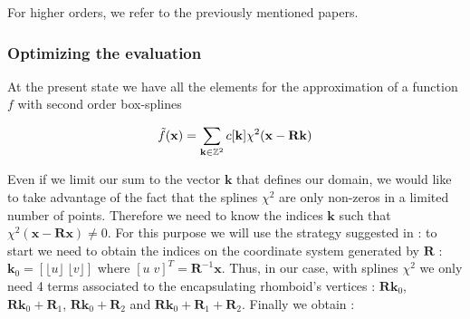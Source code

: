 \documentclass[proc]{edpsmath}
\begin{document}
%

For higher orders, we refer to the previously mentioned papers.

\subsubsection{Optimizing the evaluation}

At the present state we have all the elements for the approximation of a function $f$ with second order box-splines

\begin{equation}
\tilde{f}(\mathbf{x}) = \sum_{\mathbf{k} \in \mathbb{Z}^2} c[\mathbf{k}] \chi^2(\mathbf{x} - \mathbf{R}\mathbf{k})
\end{equation}

Even if we limit our sum to the vector $\mathbf{k}$ that defines our domain, we would like to take advantage of the fact that the splines $\chi^2$ are only non-zeros in a limited number of points. Therefore we need to know the indices $\mathbf{k}$ such that $\chi^2(\mathbf{x} - \mathbf{R} \mathbf{x}) \neq 0$. For this purpose we will use the strategy suggested in \cite{Condat2007} : to start we need to obtain the indices on the coordinate system generated by $\mathbf{R}$ : $\mathbf{k}_0 = \left[ \lfloor u \rfloor \; \lfloor v \rfloor \right]$ where $\left[ u \; v \right]^T = \mathbf{R}^ {-1} \mathbf{x} $. Thus, in our case, with splines $\chi^2$ we only need 4 terms associated to the encapsulating rhomboid's vertices : $\mathbf{R}\mathbf{k}_0$, $\mathbf{R}\mathbf{k}_0 + \mathbf{R}_1$, $\mathbf{R}\mathbf{k}_0 + \mathbf{R}_2$ and $\mathbf{R}\mathbf{k}_0 + \mathbf{R}_1 + \mathbf{R}_2$. Finally we obtain :
\end{document}
